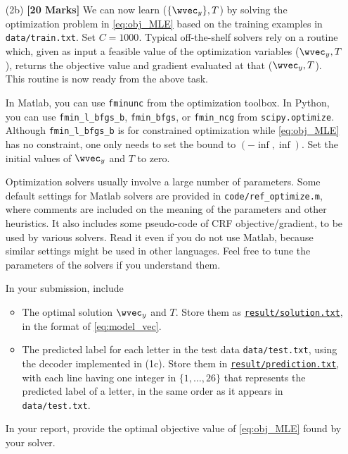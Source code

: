 \documentclass[11pt]{report}
\begin{document}
\begin{itemize}
	{\bf Provide} the value of $\frac{1}{n} \sum_{i=1}^n \log p(\yvec^i | X^i)$ for this case in your report.
	
	For your reference,
	in your instructor's Matlab implementation (65 lines),
	it takes 5 seconds to compute the gradient on the whole training set.
	Single core.
	
	
	\item[(2b)] {\bf [20 Marks]} We can now learn ($\{\wvec_y\}, T$) by solving the optimization problem in \eqref{eq:obj_MLE} based on the training examples in \verb#data/train.txt#.
	Set $C = 1000$.
	Typical off-the-shelf solvers rely on a routine which, given as input a feasible value of the optimization variables ($\wvec_y, T$), returns the objective value and gradient evaluated at that ($\wvec_y, T$). This routine is now ready from the above task.
	
	In Matlab, you can use \verb#fminunc# from the optimization toolbox. In Python, you can use \verb#fmin_l_bfgs_b#, \verb#fmin_bfgs#, or \verb#fmin_ncg# from \verb#scipy.optimize#.
	Although \verb#fmin_l_bfgs_b# is for constrained optimization while \eqref{eq:obj_MLE} has no constraint, one only needs to set the bound to $(-\inf, \inf)$.  Set the initial values of $\wvec_y$ and $T$ to zero.
	
	Optimization solvers usually involve a large number of parameters.
	Some default settings for Matlab solvers are provided in \verb#code/ref_optimize.m#,
	where comments are included on the meaning of the parameters and other heuristics.
	It also includes some pseudo-code of CRF objective/gradient,
	to be used by various solvers.
	Read it even if you do not use Matlab, because similar settings might be used in other languages.
	Feel free to tune the parameters of the solvers if you understand them.
	
	In your submission, include
	\begin{itemize}
		\item The optimal solution $\wvec_y$ and $T$.  Store them as \underline{\tt{result/solution.txt}}, in the format of \eqref{eq:model_vec}.
		\item The predicted label for each letter in the test data \verb#data/test.txt#, using the decoder implemented in (1c).
		Store them in \underline{\tt{result/prediction.txt}},
		with each line having one integer in $\{1,\ldots, 26\}$ that represents the predicted label of a letter, in the same order as it appears in \verb#data/test.txt#.
	\end{itemize}
	In your report, provide the optimal objective value of \eqref{eq:obj_MLE} found by your solver.
\end{itemize}
\end{document}

